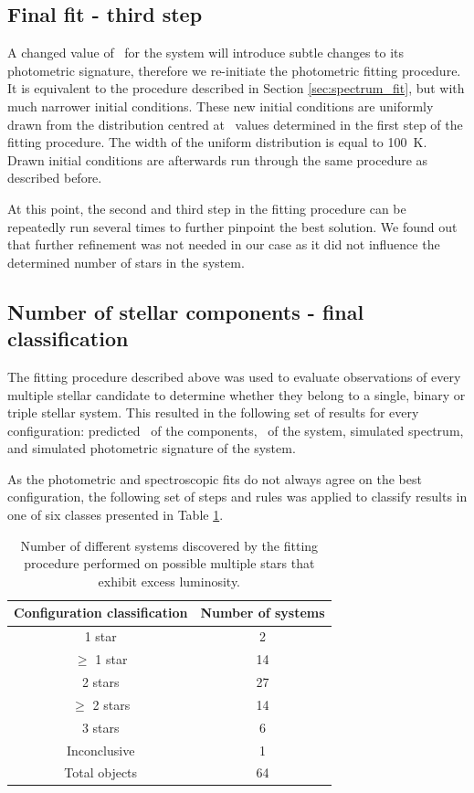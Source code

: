 \subsection{Final fit - third step}
\label{sec:final_fit}
A changed value of \Feh\ for the system will introduce subtle changes to its photometric signature, therefore we re-initiate the photometric fitting procedure. It is equivalent to the procedure described in Section \ref{sec:spectrum_fit}, but with much narrower initial conditions. These new initial conditions are uniformly drawn from the distribution centred at \Teff\ values determined in the first step of the fitting procedure. The width of the uniform distribution is equal to 100~K. Drawn initial conditions are afterwards run through the same procedure as described before.

At this point, the second and third step in the fitting procedure can be repeatedly run several times to further pinpoint the best solution. We found out that further refinement was not needed in our case as it did not influence the determined number of stars in the system.


\subsection{Number of stellar components - final classification}
\label{sec:number_stars_tripple}
The fitting procedure described above was used to evaluate observations of every multiple stellar candidate to determine whether they belong to a single, binary or triple stellar system. This resulted in the following set of results for every configuration: predicted \Teff\ of the components, \Feh\ of the system, simulated spectrum, and simulated photometric signature of the system.

As the photometric and spectroscopic fits do not always agree on the best configuration, the following set of steps and rules was applied to classify results in one of six classes presented in Table \ref{tab:res_multiples}.

\begin{table}
	\centering
	\caption{Number of different systems discovered by the fitting procedure performed on possible multiple stars that exhibit excess luminosity.}
	\begin{tabular}{c c}
		\hline
		Configuration classification & Number of systems \\ 
		\hline
		1 star & 2 \\
		$\geq$ 1 star & 14 \\
		2 stars & 27 \\
		$\geq$ 2 stars & 14 \\
		3 stars & 6 \\
		Inconclusive & 1 \\
		\hline
		Total objects & 64 \\
		\hline
	\end{tabular}
	\label{tab:res_multiples}
\end{table}


